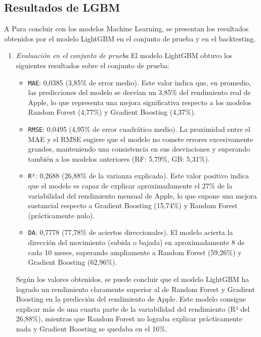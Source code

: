\subsection{Resultados de LGBM}
\label{lgbm_results}
A Para concluir con los modelos Machine Learning, se presentan los resultados obtenidos por el modelo LightGBM en el conjunto de prueba y en el backtesting.

\begin{enumerate}
    \item \emph{Evaluación en el conjunto de prueba}
    El modelo LightGBM obtuvo los siguientes resultados sobre el conjunto de prueba:

    \begin{itemize}
        \item \texttt{MAE}: 0,0385 (3,85\% de error medio). Este valor indica que, en promedio, las predicciones del modelo se desvían un 3,85\% del rendimiento real de Apple, lo que representa una mejora significativa respecto a los modelos Random Forest (4,77\%) y Gradient Boosting (4,37\%).
        \item \texttt{RMSE}: 0,0495 (4,95\% de error cuadrático medio). La proximidad entre el MAE y el RMSE sugiere que el modelo no comete errores excesivamente grandes, manteniendo una consistencia en sus desviaciones y superando también a los modelos anteriores (RF: 5,79\%, GB: 5,31\%).
        \item \texttt{R²}: 0,2688 (26,88\% de la varianza explicada). Este valor positivo indica que el modelo es capaz de explicar aproximadamente el 27\% de la variabilidad del rendimiento mensual de Apple, lo que supone una mejora sustancial respecto a Gradient Boosting (15,74\%) y Random Forest (prácticamente nulo).   
        \item \texttt{DA}: 0,7778 (77,78\% de aciertos direccionales). El modelo acierta la dirección del movimiento (subida o bajada) en aproximadamente 8 de cada 10 meses, superando ampliamente a Random Forest (59,26\%) y Gradient Boosting (62,96\%).
    \end{itemize}

    Según los valores obtenidos, se puede concluir que el modelo LightGBM ha logrado un rendimiento claramente superior al de Random Forest y Gradient Boosting en la predicción del rendimiento de Apple. Este modelo consigue explicar más de una cuarta parte de la variabilidad del rendimiento (R² del 26,88\%), mientras que Random Forest no lograba explicar prácticamente nada y Gradient Boosting se quedaba en el 16\%. 
    

\end{enumerate}
